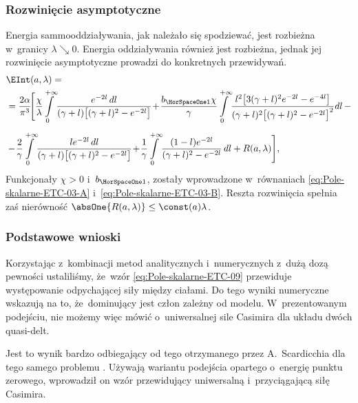 \documentclass[10pt,t]{beamer}
\begin{document}
\begin{frame}
  \frametitle{Rozwinięcie asymptotyczne}


  Energia sammooddziaływania, jak należało się spodziewać, jest rozbieżna
  w~granicy $\lambda \searrow 0$. Energia oddziaływania również jest rozbieżna, jednak
  jej rozwinięcie asymptotyczne prowadzi do konkretnych przewidywań.
  \begin{equation}
    \label{eq:Pole-skalarne-ETC-09}
    \begin{split}
      &\EInt( a, \lambda ) = \\
      &=
        \frac{ 2 \alpha }{ \pi^{ 3 } } \! \Bigg[ \frac{ \chi }{ \lambda } \!
        \int\limits_{ 0 }^{ +\infty } \!
        \frac{ e^{ -2 l } \, dl }{ ( \gamma + l )
        \big[ ( \gamma + l )^{ 2 } - e^{ -2 l } \big] } \! + \!
        \frac{ b_{ \HorSpaceOne 1 } \chi }{ \gamma } \!
        \int\limits_{ 0 }^{ +\infty } \!
        \frac{ l^{ 2 } \big[ 3 ( \gamma + l )^{ 2 } e^{ -2 l } -
        e^{ -4 l } \big] }
        { ( \gamma + l )^{ 2 }
        \big[ ( \gamma + l )^{ 2 } - e^{ -2 l } \big]^{ 2 } } dl
        \, - \\[0.5em]
      &- \! \frac{ 2 }{ \gamma } \! \int\limits_{ 0 }^{ +\infty } \!
        \frac{ l e^{ -2 l }\, dl }{ ( \gamma + l )
        \big[ ( \gamma + l )^{ 2 } - e^{ -2 l } \big] } \! + \!
        \frac{ 1 }{ \gamma } \!
        \int\limits_{ 0 }^{ +\infty } \! \frac{ ( 1 - l ) e^{ -2 l } }{
        ( \gamma + l )^{ 2 } - e^{ -2 l } } \, dl + R( a, \lambda ) \Bigg],
    \end{split}
  \end{equation}
  Funkcjonały $\chi > 0$ i~$b_{ \HorSpaceOne 1 }$, zostały wprowadzone
  w~równaniach \eqref{eq:Pole-skalarne-ETC-03-A}
  i~\eqref{eq:Pole-skalarne-ETC-03-B}. Reszta rozwinięcia spełnia zaś
  nierówność $\absOne{ R( a, \lambda ) } \leq \const( a ) \lambda$.

\end{frame}





\begin{frame}
  \frametitle{Podstawowe wnioski}


  Korzystając z~kombinacji metod analitycznych i~numerycznych z~dużą
  dozą pewności ustaliliśmy, że~wzór
  \eqref{eq:Pole-skalarne-ETC-09} przewiduje występowanie
  \alert{odpychającej} siły między ciałami. Do tego wyniki numeryczne
  wskazują na to, że~dominujący jest człon \alert{zależny od modelu}.
  W~prezentowanym podejściu, nie możemy więc mówić o~uniwersalnej sile
  Casimira dla układu dwóch quasi-delt.

  Jest to wynik bardzo odbiegający od tego otrzymanego przez A.~Scardicchia
  dla tego samego problemu
  \parencite{Scardicchio-Casimir-dynamics-ETC-2005}. Używają wariantu
  podejścia opartego o~energię punktu zerowego, wprowadził on wzór
  przewidujący \alert{uniwersalną} i~\alert{przyciągającą} siłę Casimira.

\end{frame}
\end{document}
